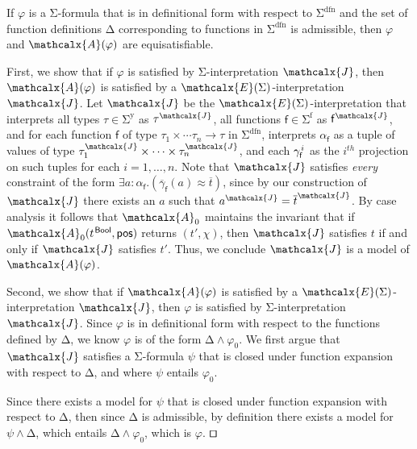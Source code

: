 \documentclass[runningheads,a4paper]{llncs}
\newcommand\DDD{\Delta}
\newcommand{\con}[1]{\mathsf{#1}}
\renewcommand\vec[1]{\overline{#1}}
\let\oldSigma=\Sigma
\def\Sigma{\mathrm{\oldSigma}}
\let\oldDelta=\Delta
\def\Delta{\mathrm{\oldDelta}}
\let\oldwedge=\wedge
\def\wedge{\mathrel{\oldwedge}}
\newcommand{\teq}{\approx}
\newcommand{\I}{\mathcalx{J}} %
\newcommand{\J}{\mathcalx{J}}
\newcommand{\conv}{\mathcalx{A}}
\newcommand{\ssorts}[1]{#1^\mathrm{y}}
\newcommand{\sfuns}[1]{#1^\mathrm{f}}
\newcommand{\sfundefs}[1]{#1^\mathrm{dfn}}
\newcommand{\ppos}{\con{pos}}
\newcommand\ty[1]{\con{#1}}
\newcommand{\Bool}{\ty{Bool}}
\newcommand\concret{\gamma} %
\newcommand{\vecfarg}[1]{\vec{\concret}_{#1}}
\newcommand{\fargx}[2]{\concret^{\vthinspace#2}_{#1}}
\newcommand{\fargsort}[1]{\alpha_{#1}}
\newcommand{\extendsig}[1]{\mathcalx{E}( #1 )}
\newcommand{\vthinspace}{\kern+0.083333em}
\newcommand{\typ}[1]{^{\vthinspace #1}}
\renewcommand\qed{{\hfill$\squareforqed$}}
\begin{document}

\begin{theorem}\label{thm:equi}
If $\varphi$ is a\/ $\Sigma$-formula that is in definitional form with respect to\/
$\sfundefs{\Sigma}$
and the set of function definitions\/ $\DDD$ corresponding to functions in
$\sfundefs{\Sigma}$ is admissible, then\/ $\varphi$ and\/ $\conv( \varphi )$ are
equisatisfiable.
\end{theorem}
\begin{proofsketch}
First, we show that if $\varphi$ is satisfied by $\Sigma$-interpretation $\I$, then $\conv( \varphi )$ is satisfied by a $\extendsig{\Sigma}$-interpretation $\J$.
Let $\J$ be the $\extendsig{\Sigma}$-interpretation that interprets all types $\tau \in \ssorts{\Sigma}$ as $\tau^\I$,
all functions $\con{f} \in \sfuns{\Sigma}$ as $\con{f}^\I$,
and for each function $\con{f}$ of type $\tau_1 \times \cdots \tau_n \rightarrow \tau$ in $\sfundefs{\Sigma}$,
interprets $\fargsort{\con{f}}$ as a tuple of values of type $\tau_1^\I \times \cdots \times \tau_n^\I$,
and each $\fargx{\con{f}}{i}$ as the $i^{th}$ projection on such tuples for each $i = 1, \ldots, n$.
Note that $\J$ satisfies \emph{every} constraint of the form $\exists a : {\fargsort{\con{f}}}. ( \vecfarg{\con{f}}( a ) \teq \vec t )$,
since by our construction of $\J$ there exists an $a$ such that $a^\J = \vec t^\J$.
By case analysis it follows that $\conv_0$ maintains the invariant that
if $\conv_0( t\typ{\Bool}, \ppos )$ returns $( {t'}, \chi )$,
then $\I$ satisfies $t$ if and only if $\J$ satisfies $t'$.
Thus, we conclude $\J$ is a model of $\conv( \varphi )$.

Second, we show that if $\conv( \varphi )$ is satisfied by a
$\extendsig{\Sigma}$-interpretation $\I$, then $\varphi$ is satisfied by
$\Sigma$-interpretation $\J$. Since $\varphi$ is in definitional form with
respect to the functions defined by $\DDD$, we know $\varphi$ is of the form
$\DDD \wedge \varphi_0$. We first argue that $\I$ satisfies a $\Sigma$-formula
$\psi$ that is closed under function expansion with respect to $\DDD$, and
where $\psi$ entails $\varphi_0$.

Since there exists a model for $\psi$ that is closed under function expansion
with respect to $\DDD$, then since $\DDD$ is admissible, by definition there
exists a model for $\psi \wedge \DDD$, which entails $\DDD \wedge \varphi_0$,
which is $\varphi$.
\qed
\end{proofsketch}
\end{document}
